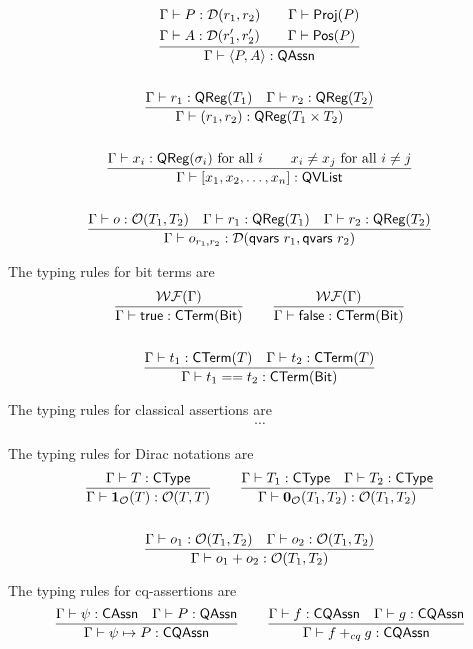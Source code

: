 \begin{gather*}
    \frac{
        \begin{aligned}
            & \Gamma \vdash P : \mathcal{D}(r_1, r_2) \qquad \Gamma \vdash \textsf{Proj}({P}) \\
            & \Gamma \vdash A : \mathcal{D}(r_1', r_2') \qquad \Gamma \vdash \textsf{Pos}({P})
        \end{aligned}
    }{\Gamma \vdash \langle P, A \rangle : \textsf{QAssn}} \\
    \\
    \frac{\Gamma \vdash r_1 : \textsf{QReg}(T_1) \quad \Gamma \vdash r_2 : \textsf{QReg}(T_2)}{\Gamma \vdash (r_1, r_2) : \textsf{QReg}(T_1 \times T_2)}
    \\
    \\
    \frac{\Gamma \vdash x_i : \textsf{QReg}(\sigma_i) \text{ for all } i \qquad x_i \neq x_j \text{ for all } i \neq j}{\Gamma \vdash [x_1, x_2, \dots, x_n] : \textsf{QVList}} \\
    \\
    \frac{\Gamma \vdash o : \mathcal{O}(T_1, T_2) \quad \Gamma \vdash r_1 : \textsf{QReg}(T_1) \quad \Gamma \vdash r_2 : \textsf{QReg}(T_2)}{\Gamma \vdash o_{r_1,r_2} : \mathcal{D}(\textsf{qvars}\ r_1, \textsf{qvars}\ r_2)}
\end{gather*}

The typing rules for bit terms are
\begin{gather*}
    \frac{\mathcal{WF}(\Gamma)}{\Gamma \vdash \textsf{true}: \textsf{CTerm}(\textsf{Bit})}
    \qquad
    \frac{\mathcal{WF}(\Gamma)}{\Gamma \vdash \textsf{false}: \textsf{CTerm}(\textsf{Bit})} \\
    \\
    \frac{\Gamma \vdash t_1 : \textsf{CTerm}(T) \quad \Gamma \vdash t_2 : \textsf{CTerm}(T)}{\Gamma \vdash t_1 == t_2 : \textsf{CTerm}(\textsf{Bit})}
\end{gather*}

The typing rules for classical assertions are
\begin{gather*}
    \cdots
\end{gather*}

The typing rules for Dirac notations are
\begin{gather*}
    \frac{\Gamma \vdash T : \textsf{CType}}{\Gamma \vdash \mathbf{1}_\mathcal{O}(T) : \mathcal{O}(T, T)}
    \qquad
    \frac{\Gamma \vdash T_1 : \textsf{CType} \quad \Gamma \vdash T_2 : \textsf{CType}}{\Gamma \vdash \mathbf{0}_\mathcal{O}(T_1, T_2) : \mathcal{O}(T_1, T_2)} \\
    \\
    \frac{\Gamma \vdash o_1 : \mathcal{O}(T_1, T_2) \quad \Gamma \vdash o_2 : \mathcal{O}(T_1, T_2)}{\Gamma \vdash o_1 + o_2 : \mathcal{O}(T_1, T_2)}
\end{gather*}

The typing rules for cq-assertions are
\begin{gather*}
    \frac{\Gamma \vdash \psi : \textsf{CAssn} \quad \Gamma \vdash P : \textsf{QAssn}}{\Gamma \vdash \psi \mapsto P : \textsf{CQAssn}}
    \qquad
    \frac{\Gamma \vdash f : \textsf{CQAssn} \quad \Gamma \vdash g : \textsf{CQAssn}}{\Gamma \vdash f +_{cq} g : \textsf{CQAssn}}
\end{gather*}


